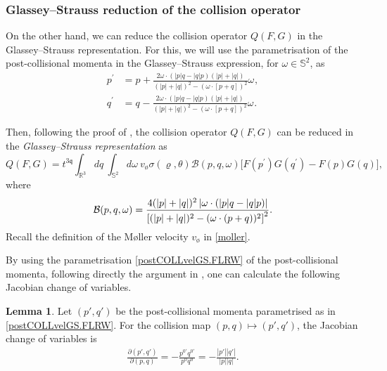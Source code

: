 \documentclass[reqno]{amsart}
\newcommand{\pv}{p}
\newcommand{\qv}{q}
\newcommand{\qq}{\mathfrak{q}}
\newcommand{\tTq}{t^{3\qq}}
\newcommand{\Emptyset}{\text{\o}}
\newcommand{\mrel}{\varrho}
\theoremstyle{definition}
\newtheorem{lemma}[theorem]{Lemma}
\numberwithin{equation}{section}
\numberwithin{theorem}{section}
\begin{document}
\subsubsection{Glassey--Strauss reduction of the collision operator}



On the other hand, we can reduce the collision operator \(Q(F,G)\) in the Glassey--Strauss representation. For this, we will use the parametrisation of the post-collisional momenta in the Glassey--Strauss expression, for \(\omega\in \mathbb{S}^2\), as
\begin{equation}
\begin{split}
\pv^{\prime } &= 
\pv^{} 
+
\frac{2\omega \cdot (|\pv|  \qv- |\qv|  \pv)(|\pv| + |\qv|) }{(|\pv| + |\qv|)^{2}-(\omega \cdot [ \pv + \qv])^{2}}\omega^{},
 \\
\qv^{\prime } &= 
\qv^{} 
-
\frac{2\omega \cdot (|\pv|  \qv- |\qv|  \pv)(|\pv| + |\qv|) }{(|\pv| + |\qv|)^{2}-(\omega \cdot [ \pv + \qv])^{2}} \omega^{}.
\end{split}
\label{postCOLLvelGS.FLRW}
\end{equation}



Then, following the proof of \cite[Theorem 4]{MR2765751}, the collision operator \(Q(F,G)\) can be reduced in the \emph{Glassey--Strauss representation} as 
\begin{equation}
Q(F,G)
=
\tTq\int_{\mathbb{R}^3}  {dq}  ~
\int_{\mathbb{S}^{2}} d\omega 
~ v_{\Emptyset}  \sigma (\mrel,\theta ) \mathcal{B}({\pv},{\qv},\omega ) \big[F(p^{\prime })G(q^{\prime})-F(p)G(q)\big],
\label{collision.GS.flrw}
\end{equation}
where 
\begin{equation}\notag
\mathcal{B}({\pv},{\qv}, {\omega} )
=
\frac{4 (|{\pv}| + |{\qv}|)^2\left|{\omega} \cdot (|{\pv}|  {\qv}- |{\qv}|  {\pv})\right| }{\left[(|{\pv}| + |{\qv}|)^{2}-({\omega} \cdot ( {\pv} + {\qv}))^{2}\right]^{2}}.
\end{equation}
Recall the definition of the Møller velocity $v_{\Emptyset}$ in \eqref{moller}. 




By using the parametrisation \eqref{postCOLLvelGS.FLRW} of the post-collisional momenta, following directly the argument in \cite{MR1105532}, one can calculate the following Jacobian change of variables.  


\begin{lemma}\label{Lem change of variables}
Let $(p',q')$ be the post-collisional
momenta parametrised as in \eqref{postCOLLvelGS.FLRW}. For the collision map
$(p,q)\mapsto(p',q')$, the Jacobian change of variables is
\begin{align}\label{Jacobian.COV}
    \frac{\partial(p',q')}{\partial(p,q)}=-\frac{p^{0\prime}q^{0\prime}}{p^0q^0}
    =-\frac{|\pv'| |\qv'|}{|\pv| |\qv|}.
\end{align}
\end{lemma}
\end{document}
